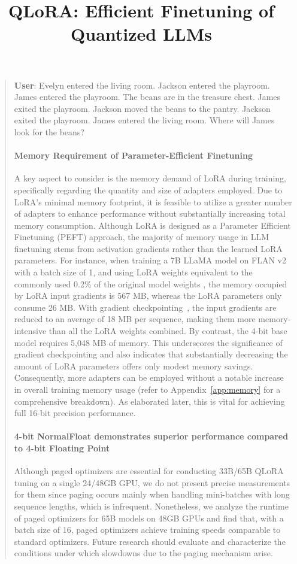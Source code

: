 \title{QLoRA: Efficient Finetuning of Quantized LLMs}
\begin{quote}
    \textbf{User}: Evelyn entered the living room. Jackson entered the playroom. James entered the playroom. The beans are in the treasure chest. James exited the playroom. Jackson moved the beans to the pantry. Jackson exited the playroom. James entered the living room. Where will James look for the beans?

\paragraph{Memory Requirement of Parameter-Efficient Finetuning} A key aspect to consider is the memory demand of LoRA during training, specifically regarding the quantity and size of adapters employed. Due to LoRA's minimal memory footprint, it is feasible to utilize a greater number of adapters to enhance performance without substantially increasing total memory consumption. Although LoRA is designed as a Parameter Efficient Finetuning (PEFT) approach, the majority of memory usage in LLM finetuning stems from activation gradients rather than the learned LoRA parameters. For instance, when training a 7B LLaMA model on FLAN v2 with a batch size of 1, and using LoRA weights equivalent to the commonly used 0.2\% of the original model weights \citep{hu2021lora,liu2022few}, the memory occupied by LoRA input gradients is 567 MB, whereas the LoRA parameters only consume 26 MB. With gradient checkpointing~\citep{chen2016training}, the input gradients are reduced to an average of 18 MB per sequence, making them more memory-intensive than all the LoRA weights combined. By contrast, the 4-bit base model requires 5,048 MB of memory. This underscores the significance of gradient checkpointing and also indicates that substantially decreasing the amount of LoRA parameters offers only modest memory savings. Consequently, more adapters can be employed without a notable increase in overall training memory usage (refer to Appendix~\ref{app:memory} for a comprehensive breakdown). As elaborated later, this is vital for achieving full 16-bit precision performance.

\paragraph{4-bit NormalFloat demonstrates superior performance compared to 4-bit Floating Point}

Although paged optimizers are essential for conducting 33B/65B \textsc{QLoRA} tuning on a single 24/48GB GPU, we do not present precise measurements for them since paging occurs mainly when handling mini-batches with long sequence lengths, which is infrequent. Nonetheless, we analyze the runtime of paged optimizers for 65B models on 48GB GPUs and find that, with a batch size of 16, paged optimizers achieve training speeds comparable to standard optimizers. Future research should evaluate and characterize the conditions under which slowdowns due to the paging mechanism arise.


\end{quote}
